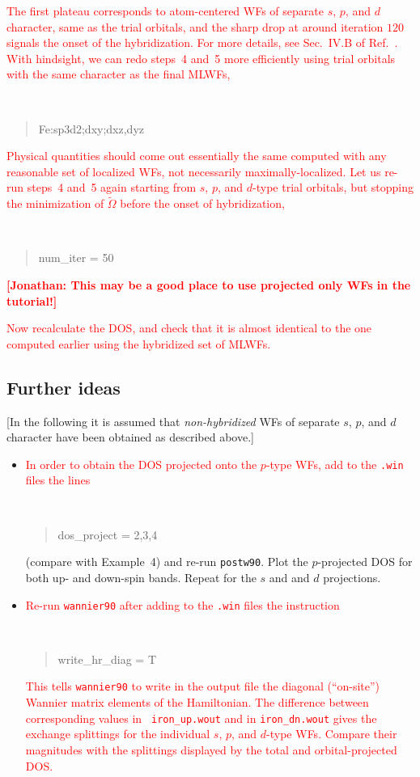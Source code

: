 \documentclass[a4paper,11pt,twoside]{article}
\def\tent#1{\textcolor{red}{#1}}     %
\begin{document}
\tent{The first plateau corresponds to atom-centered WFs of separate
  $s$, $p$, and $d$ character, same as the trial orbitals, and the
  sharp drop at around iteration $120$ signals the onset of the
  hybridization. For more details, see Sec.~IV.B of
  Ref.~\cite{wang-prb06}. With hindsight, we can redo steps~4 and~5
  more efficiently using trial orbitals with the same character as the
  final MLWFs,} {\tt
\begin{quote}
Fe:sp3d2;dxy;dxz,dyz
\end{quote}
}


\tent{Physical quantities should come out essentially the same
  computed with any reasonable set of localized WFs, not necessarily
  maximally-localized.  Let us re-run steps~4 and~5 again starting
  from $s$, $p$, and $d$-type trial orbitals, but stopping the
  minimization of $\widetilde{\Omega}$ before the onset of
  hybridization,} {\tt
\begin{quote}
num\_iter = 50
\end{quote}
}

\tent{{\bf[Jonathan: This may be a good place to use projected only WFs
in the tutorial!]}}

\tent{Now recalculate the DOS, and check that it is almost identical to
  the one computed earlier using the hybridized set of MLWFs.}


\subsection*{Further ideas}

[In the following it is assumed that {\it non-hybridized} WFs of
separate $s$, $p$, and $d$ character have been obtained as described
above.]

\begin{itemize}

\item \tent{In order to obtain the DOS projected onto the $p$-type
    WFs, add to the {\tt .win} files the lines} {\tt
\begin{quote}
dos\_project = 2,3,4
\end{quote}
}

(compare with Example~4)
and re-run {\tt postw90}. Plot the $p$-projected DOS for both up- and
down-spin bands. Repeat for the $s$ and and $d$ projections.

\item \tent{Re-run {\tt wannier90} after adding to the {\tt .win}
    files the instruction} {\tt
\begin{quote}
write\_hr\_diag = T
\end{quote}
}

\tent{This tells {\tt wannier90} to write in the output file the
  diagonal (``on-site'') Wannier matrix elements of the
  Hamiltonian. The difference between corresponding values in {\tt
    iron\_up.wout} and in {\tt iron\_dn.wout} gives the exchange
  splittings for the individual $s$, $p$, and $d$-type WFs. Compare
  their magnitudes with the splittings displayed by the total and
  orbital-projected DOS.}

\end{itemize}
\end{document}

